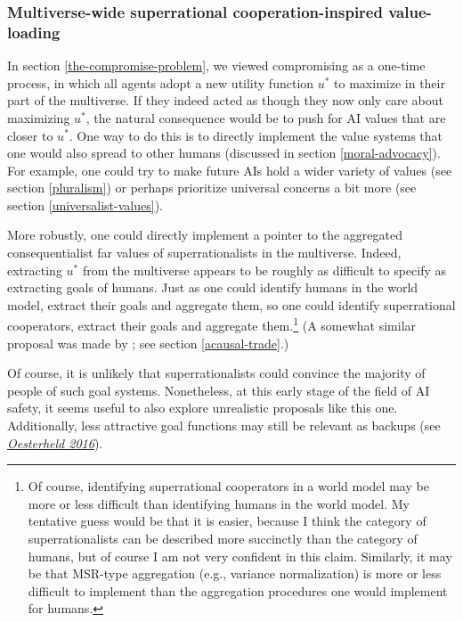 \subsubsection{Multiverse-wide superrational cooperation-inspired
value-loading}\label{multiverse-wide-superrational-cooperation-inspired-value-loading}

In section \ref{the-compromise-problem}, we viewed compromising as a one-time process, in
which all agents adopt a new utility function \(u^{*}\) to maximize in
their part of the multiverse. If they indeed acted as though they now
only care about maximizing \(u^{*}\), the natural consequence would be
to push for AI values that are closer to \(u^{*}\). One way to do this
is to directly implement the value systems that one would also spread to
other humans (discussed in section
\ref{moral-advocacy}). For
example, one could try to make future AIs hold a wider variety of values
(see section \ref{pluralism}) or
perhaps prioritize universal concerns a bit more (see section
\ref{universalist-values}).

More robustly, one could directly implement a pointer to the aggregated
consequentialist far values of superrationalists in the multiverse.
Indeed, extracting \(u^{*}\) from the multiverse appears to be roughly
as difficult to specify as extracting goals of humans. Just as one could
identify humans in the world model, extract their goals and aggregate
them, so one could identify superrational cooperators, extract their
goals and aggregate them.\footnote{Of course, identifying superrational
  cooperators in a world model may be more or less difficult than
  identifying humans in the world model. My tentative guess would be
  that it is easier, because I think the category of superrationalists
  can be described more succinctly than the category of humans, but of
  course I am not very confident in this claim. Similarly, it may be
  that MSR-type aggregation (e.g., variance normalization) is more or
  less difficult to implement than the aggregation procedures one would
  implement for humans.} (A somewhat similar proposal was made by
\parencite{Bostrom2014-gy}; see section
\ref{acausal-trade}.)

Of course, it is unlikely that superrationalists could convince the
majority of people of such goal systems. Nonetheless, at this early
stage of the field of AI safety, it seems useful to also explore
unrealistic proposals like this one. Additionally, less attractive goal
functions may still be relevant as backups (see
\href{https://foundational-research.org/files/backup-utility-functions.pdf}{\emph{Oesterheld
2016}}).

